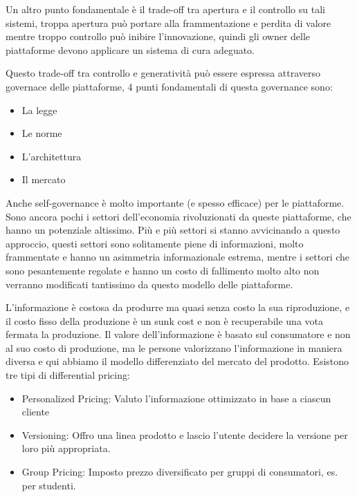 \documentclass[a4page, 11pt]{article}
\begin{document}
Un altro punto fondamentale è il trade-off tra apertura e il controllo
su tali sistemi, troppa apertura può portare alla frammentazione e
perdita di valore mentre troppo controllo può inibire l'innovazione,
quindi gli owner delle piattaforme devono applicare un sistema di cura
adeguato.

Questo trade-off tra controllo e generatività può essere espressa
attraverso governace delle piattaforme, 4 punti fondamentali di questa
governance sono:

\begin{itemize}
	 
	\item
	La legge
	\item
	Le norme
	\item
	L'architettura
	\item
	Il mercato
\end{itemize}

Anche self-governance è molto importante (e spesso efficace) per le
piattaforme. Sono ancora pochi i settori dell'economia rivoluzionati da
queste piattaforme, che hanno un potenziale altissimo. Più e più settori
si stanno avvicinando a questo approccio, questi settori sono
solitamente piene di informazioni, molto frammentate e hanno un
asimmetria informazionale estrema, mentre i settori che sono
pesantemente regolate e hanno un costo di fallimento molto alto non
verranno modificati tantissimo da questo modello delle piattaforme.

L'informazione è costosa da produrre ma quasi senza costo la sua
riproduzione, e il costo fisso della produzione è un sunk cost e non è
recuperabile una vota fermata la produzione. Il valore dell'informazione
è basato sul consumatore e non al suo costo di produzione, ma le persone
valorizzano l'informazione in maniera diversa e qui abbiamo il modello
differenziato del mercato del prodotto. Esistono tre tipi di
differential pricing:

\begin{itemize}
	 
	\item
	Personalized Pricing: Valuto l'informazione ottimizzato in base a
	ciascun cliente
	\item
	Versioning: Offro una linea prodotto e lascio l'utente decidere la
	versione per loro più appropriata.
	\item
	Group Pricing: Imposto prezzo diversificato per gruppi di consumatori,
	es. per studenti.
\end{itemize}
\end{document}
